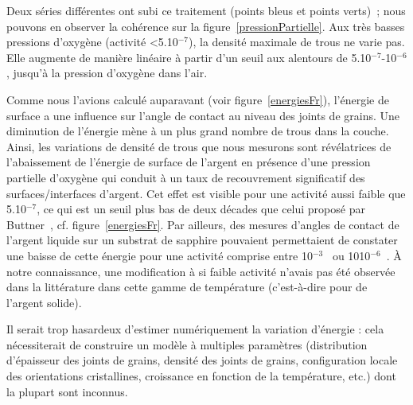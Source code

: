 Deux séries différentes ont subi ce traitement (points bleus et points verts)~; nous pouvons en observer la cohérence sur la figure~\ref{pressionPartielle}. Aux très basses pressions d’oxygène (activité <5.10$^{-7}$), la densité maximale de trous ne varie pas. Elle augmente de manière linéaire à partir d’un seuil aux alentours de 5.10$^{-7}$-10$^{-6}$, jusqu’à la pression d’oxygène dans l’air.\par 
Comme nous l’avions calculé auparavant (voir figure~\ref{energiesFr}), l’énergie de surface a une influence sur l’angle de contact au niveau des joints de grains. Une diminution de l’énergie mène à un plus grand nombre de trous dans la couche. Ainsi, les variations de densité de trous que nous mesurons sont révélatrices de l’abaissement de l’énergie de surface de l’argent en présence d'une pression partielle d'oxygène qui conduit à un taux de recouvrement significatif des surfaces/interfaces d'argent. Cet effet est visible pour une activité aussi faible que 5.10$^{-7}$, ce qui est un seuil plus bas de deux décades que celui proposé par Buttner~\cite{buttner1952adsorption}, cf. figure~\ref{energiesFr}. Par ailleurs, des mesures d'angles de contact de l'argent liquide sur un substrat de sapphire pouvaient permettaient de constater une baisse de cette énergie pour une activité comprise entre 10$^{-3}$~\cite{chatain94} ou 1010$^{-6}$~\cite{muolo08}.  À notre connaissance, une modification à si faible activité n’avais pas été observée dans la littérature dans cette gamme de température (c'est-à-dire pour de l'argent solide).\par 
Il serait trop hasardeux d’estimer numériquement la variation d’énergie : cela nécessiterait de construire un modèle à multiples paramètres (distribution d’épaisseur des joints de grains, densité des joints de grains, configuration locale des orientations cristallines, croissance en fonction de la température, etc.) dont la plupart sont inconnus.\par 
{}

